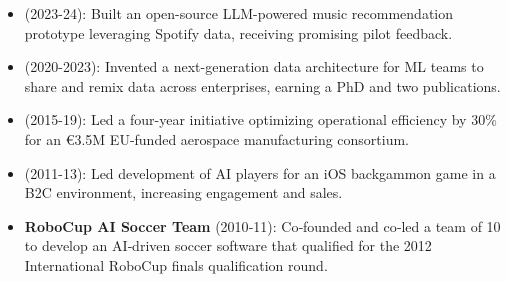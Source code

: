 \begin{itemize}

\item {} (2023-24): Built an open-source LLM-powered music recommendation prototype leveraging Spotify data, receiving promising pilot feedback.


\item {} (2020-2023): Invented a next-generation data architecture for ML teams to share and remix data across enterprises, earning a PhD and two publications.


\item {} (2015-19): Led a four-year initiative optimizing operational efficiency by 30\% for an €3.5M EU-funded aerospace manufacturing consortium.


\item {} (2011-13): Led development of AI players for an iOS backgammon game in a B2C environment, increasing engagement and sales.

\item \textbf{RoboCup AI Soccer Team} (2010‑11): Co‑founded and co‑led a team of 10 to develop an AI‑driven soccer software that qualified for the 2012 International RoboCup finals qualification round.





\end{itemize}
